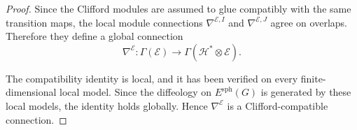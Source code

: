 \documentclass[10pt,a4paper]{amsart}
\begin{document}
\begin{proof}
Since the Clifford modules are assumed to glue compatibly with the same
transition maps, the local module connections
\(\nabla^{\mathcal E,I}\) and \(\nabla^{\mathcal E,J}\) agree on overlaps.
Therefore they define a global connection
\[
\nabla^{\mathcal E}:\Gamma(\mathcal E)
\to
\Gamma(\mathcal H^*\otimes\mathcal E).
\]

The compatibility identity is local, and it has been verified on every
finite-dimensional local model. Since the diffeology on
\(E^{\mathrm{sph}}(G)\) is generated by these local models, the identity
holds globally. Hence \(\nabla^{\mathcal E}\) is a Clifford-compatible
connection.
\end{proof}
\end{document}
